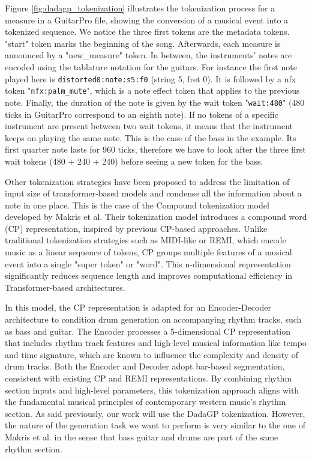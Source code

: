 Figure \ref{fig:dadagp_tokenization} illustrates the tokenization process for a measure in a GuitarPro file, showing the conversion of a musical event into a tokenized sequence.
We notice the three first tokens are the metadata tokens. "start" token marks the beginning of the song.
Afterwards, each measure is announced by a "new\_measure" token.
In between, the instruments' notes are encoded using the tablature notation for the guitars.
For instance the first note played here is \texttt{distorted0:note:s5:f0} (string 5, fret 0).
It is followed by a nfx token "\texttt{nfx:palm\_mute}", which is a note effect token that applies to the previous note.
Finally, the duration of the note is given by the wait token "\texttt{wait:480}" (480 ticks in GuitarPro correspond to an eighth note).
If no tokens of a specific instrument are present between two wait tokens, it means that the instrument keeps on playing the same note.
This is the case of the bass in the example.
Its first quarter note lasts for 960 ticks, therefore we have to look after the three first wait tokens (480 + 240 + 240) before seeing a new token for the bass.


Other tokenization strategies have been proposed to address the limitation of input size of transformer-based models and condense all the information about a note in one place.
This is the case of the Compound tokenization model developed by Makris et al.
Their tokenization model introduces a compound word (CP) representation, inspired by previous CP-based approaches\cite{hsiao_compound_2021}.
Unlike traditional tokenization strategies such as MIDI-like or REMI, which encode music as a linear sequence of tokens, CP groups multiple features of a musical event into a single "super token" or "word".
This n-dimensional representation significantly reduces sequence length and improves computational efficiency in Transformer-based architectures\cite{makris_conditional_2022}.


In this model, the CP representation is adapted for an Encoder-Decoder architecture to condition drum generation on accompanying rhythm tracks, such as bass and guitar.
The Encoder processes a 5-dimensional CP representation that includes rhythm track features and high-level musical information like tempo and time signature, which are known to influence the complexity and density of drum tracks.
Both the Encoder and Decoder adopt bar-based segmentation, consistent with existing CP and REMI representations.
By combining rhythm section inputs and high-level parameters, this tokenization approach aligns with the fundamental musical principles of contemporary western music's rhythm section\cite{makris_conditional_2022}.
As said previously, our work will use the DadaGP tokenization. However, the nature of the generation task we want to perform is very similar to the one of Makris et al. in the sense that bass guitar and drums are part of the same rhythm section.


